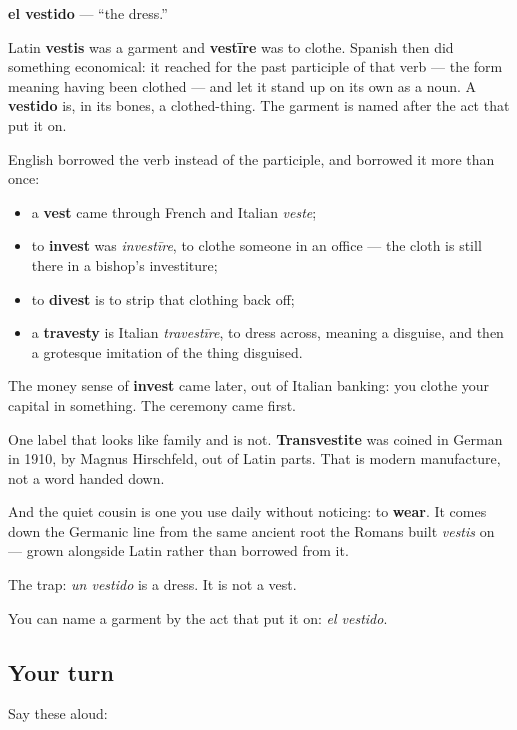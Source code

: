 \begin{cousinweb}
\textbf{el vestido} — \textquotedblleft{}the dress.\textquotedblright{}

Latin \textbf{vestis} was a garment and \textbf{vestīre} was to clothe. Spanish then did something economical: it reached for the past participle of that verb — the form meaning having been clothed — and let it stand up on its own as a noun. A \textbf{vestido} is, in its bones, a clothed-thing. The garment is named after the act that put it on.

English borrowed the verb instead of the participle, and borrowed it more than once:

\begin{itemize}
\raggedright
  \item a \textbf{vest} came through French and Italian \emph{veste};
  \item to \textbf{invest} was \emph{investīre}, to clothe someone in an office — the cloth is still there in a bishop's investiture;
  \item to \textbf{divest} is to strip that clothing back off;
  \item a \textbf{travesty} is Italian \emph{travestīre}, to dress across, meaning a disguise, and then a grotesque imitation of the thing disguised.
\end{itemize}

The money sense of \textbf{invest} came later, out of Italian banking: you clothe your capital in something. The ceremony came first.

One label that looks like family and is not. \textbf{Transvestite} was coined in German in 1910, by Magnus Hirschfeld, out of Latin parts. That is modern manufacture, not a word handed down.

And the quiet cousin is one you use daily without noticing: to \textbf{wear}. It comes down the Germanic line from the same ancient root the Romans built \emph{vestis} on — grown alongside Latin rather than borrowed from it.

The trap: \emph{un vestido} is a dress. It is not a vest.
\end{cousinweb}

\begin{grammarlens}[title={What you've built}]
You can name a garment by the act that put it on: \emph{el vestido}.
\end{grammarlens}

\subsection*{Your turn}
Say these aloud:

